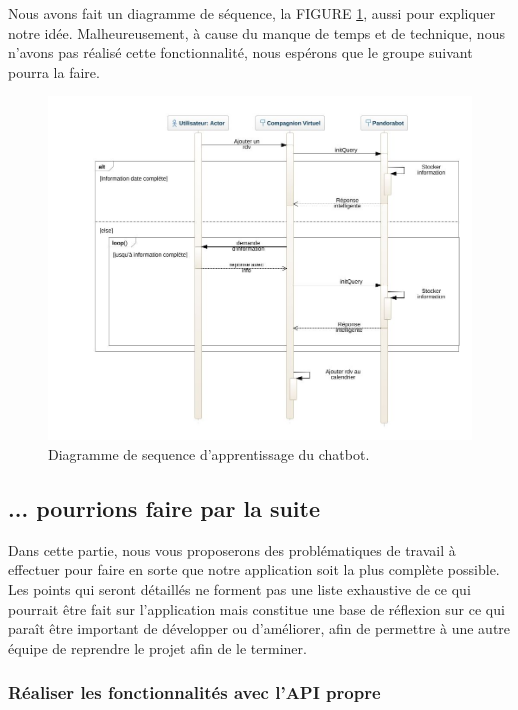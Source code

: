 \indent Nous avons fait un diagramme de séquence, la FIGURE \ref{fig4}, aussi pour expliquer notre idée. Malheureusement, à cause du manque de temps et de technique, nous n'avons pas réalisé cette fonctionnalité, nous espérons que le groupe suivant pourra la faire. 
\newpage
\begin{figure}[ht]
\centering
\includegraphics[width=1\linewidth]{./diagrammes/SequenceDiagram_multi_conversation.jpeg}
\caption{Diagramme de sequence d'apprentissage du chatbot.\label{fig4}}
\end{figure}

\subsection{... pourrions faire par la suite}

\indent Dans cette partie, nous vous proposerons des problématiques de travail à effectuer pour faire en sorte que notre application soit la plus complète possible. Les points qui seront détaillés ne forment pas une liste exhaustive de ce qui pourrait être fait sur l'application mais constitue une base de réflexion sur ce qui paraît être important de développer ou d'améliorer, afin de permettre à une autre équipe de reprendre le projet afin de le terminer.

\subsubsection{Réaliser les fonctionnalités avec l'API propre}

